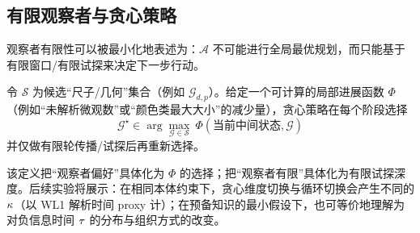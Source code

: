 \subsection{有限观察者与贪心策略}

观察者有限性可以被最小化地表述为：\(\mathcal A\) 不可能进行全局最优规划，而只能基于有限窗口/有限试探来决定下一步行动。

\begin{definition}
令 \(\mathcal S\) 为候选“尺子/几何”集合（例如 \(\mathcal G_{d,p}\)）。给定一个可计算的局部进展函数 \(\Phi\)（例如“未解析微观数”或“颜色类最大大小”的减少量），贪心策略在每个阶段选择
\[
\mathcal G^{\star}\in\arg\max_{\mathcal G\in\mathcal S}\ \Phi(\text{当前中间状态},\mathcal G)
\]
并仅做有限轮传播/试探后再重新选择。
\end{definition}

\begin{remark}
该定义把“观察者偏好”具体化为 \(\Phi\) 的选择；把“观察者有限”具体化为有限试探深度。后续实验将展示：在相同本体约束下，贪心维度切换与循环切换会产生不同的 \(\kappa\)（以 WL1 解析时间 proxy 计）；在预备知识的最小假设下，也可等价地理解为对负信息时间 \(\tau\) 的分布与组织方式的改变。
\end{remark}

